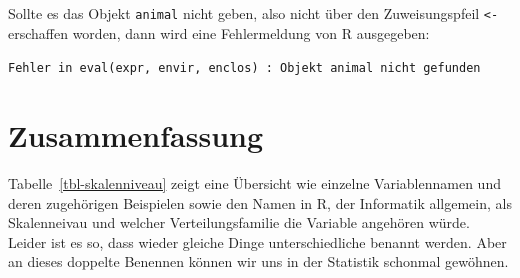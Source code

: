 \documentclass[
  letterpaper,
]{scrbook}
\begin{document}
Sollte es das Objekt \texttt{animal} nicht geben, also nicht über den
Zuweisungspfeil \texttt{\textless{}-} erschaffen worden, dann wird eine
Fehlermeldung von R ausgegeben:

\texttt{Fehler\ in\ eval(expr,\ envir,\ enclos)\ :\ Objekt\ \textquotesingle{}animal\textquotesingle{}\ nicht\ gefunden}

\hypertarget{zusammenfassung}{%
\section{Zusammenfassung}\label{zusammenfassung}}

{}

Tabelle~\ref{tbl-skalenniveau} zeigt eine Übersicht wie einzelne
Variablennamen und deren zugehörigen Beispielen sowie den Namen in R,
der Informatik allgemein, als Skalenneivau und welcher
Verteilungsfamilie die Variable angehören würde. Leider ist es so, dass
wieder gleiche Dinge unterschiedliche benannt werden. Aber an dieses
doppelte Benennen können wir uns in der Statistik schonmal gewöhnen.
\end{document}
